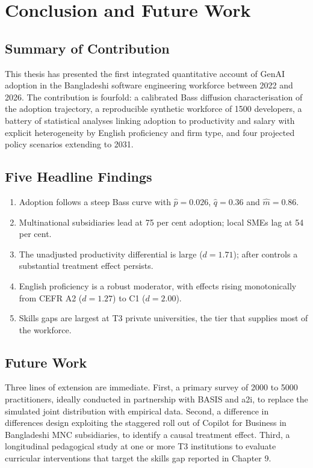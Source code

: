 \documentclass[11pt,a4paper]{report}
\begin{document}
\chapter{Conclusion and Future Work}

\section{Summary of Contribution}

This thesis has presented the first integrated quantitative account of
GenAI adoption in the Bangladeshi software engineering workforce
between 2022 and 2026. The contribution is fourfold: a calibrated Bass
diffusion characterisation of the adoption trajectory, a reproducible
synthetic workforce of 1500 developers, a battery of statistical
analyses linking adoption to productivity and salary with explicit
heterogeneity by English proficiency and firm type, and four projected
policy scenarios extending to 2031.

\section{Five Headline Findings}

\begin{enumerate}
  \item Adoption follows a steep Bass curve with $\hat{p} = 0.026$,
  $\hat{q} = 0.36$ and $\hat{m} = 0.86$.
  \item Multinational subsidiaries lead at 75 per cent adoption; local
  SMEs lag at 54 per cent.
  \item The unadjusted productivity differential is large
  ($d = 1.71$); after controls a substantial treatment effect persists.
  \item English proficiency is a robust moderator, with effects rising
  monotonically from CEFR A2 ($d = 1.27$) to C1 ($d = 2.00$).
  \item Skills gaps are largest at T3 private universities, the tier
  that supplies most of the workforce.
\end{enumerate}

\section{Future Work}

Three lines of extension are immediate. First, a primary survey of
2000 to 5000 practitioners, ideally conducted in partnership with BASIS
and a2i, to replace the simulated joint distribution with empirical
data. Second, a difference in differences design exploiting the
staggered roll out of Copilot for Business in Bangladeshi MNC
subsidiaries, to identify a causal treatment effect. Third, a
longitudinal pedagogical study at one or more T3 institutions to
evaluate curricular interventions that target the skills gap reported
in Chapter 9.
\end{document}
